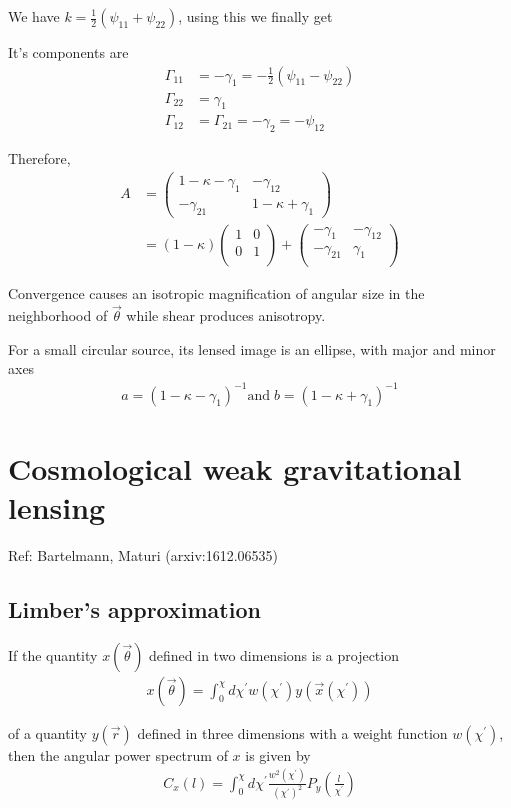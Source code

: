 \documentclass[12pt]{article}
\newcommand{\beq}{\begin{equation}}
\newcommand{\eeq}{\end{equation}}
\newcommand{\beqa}{\begin{eqnarray}}
\newcommand{\eeqa}{\end{eqnarray}}
\newcommand{\beqal}{\begin{aligned}}
\newcommand{\eeqal}{\end{aligned}}
\numberwithin{equation}{section}
\begin{document}
We have $k = \frac{1}{2} (\psi_{11} + \psi_{22})$, using this we finally get

It's components are
\beq
\beqal
\Gamma_{11} &= - \gamma_1 = -\frac{1}{2} (\psi_{11} - \psi_{22})
\\
\Gamma_{22} &= \gamma_1 
\\
\Gamma_{12} &= \Gamma_{21} = - \gamma_2 = - \psi_{12}
\eeqal
\eeq

Therefore,
\beq
\beqal
A &= 
\begin{pmatrix}
1 - \kappa - \gamma_1 & -\gamma_{12} 
\\
-\gamma_{21} & 1 - \kappa + \gamma_1
\end{pmatrix} 
\\
&= (1-\kappa) 
\begin{pmatrix}
1 & 0 \\
0 & 1 \\
\end{pmatrix}
+
\begin{pmatrix}
- \gamma_1 & -\gamma_{12} \\
-\gamma_{21} & \gamma_1 \\
\end{pmatrix}
\eeqal
\eeq

Convergence causes an isotropic magnification of angular size in the neighborhood of $\vec{\theta}$ while shear produces anisotropy.

For a small circular source, its lensed image is an ellipse, with major and minor axes
\beqa
a = (1 - \kappa - \gamma_1)^{-1} \textrm{and} \; b = (1 - \kappa + \gamma_1)^{-1}
\eeqa

\section{Cosmological weak gravitational lensing }
\begin{center}
Ref: Bartelmann, Maturi (arxiv:1612.06535)
\end{center}
\subsection{Limber's approximation}
If the quantity $x(\vec{\theta})$ defined in two dimensions is a projection
\beqa
x(\vec{\theta}) = \int_0^\chi d\chi^\prime w(\chi^\prime) y(\vec{x}(\chi^\prime))
\eeqa

of a quantity $y(\vec{r})$ defined in three dimensions with a weight function $w(\chi^\prime)$, then the angular power spectrum of $x$ is given by 
\beqa
C_x(l) = \int_0^\chi d\chi^\prime \frac{w^2(\chi^\prime)}{(\chi^\prime)^2} P_y \left( \frac{l}{\chi^\prime} \right)
\eeqa
\end{document}
